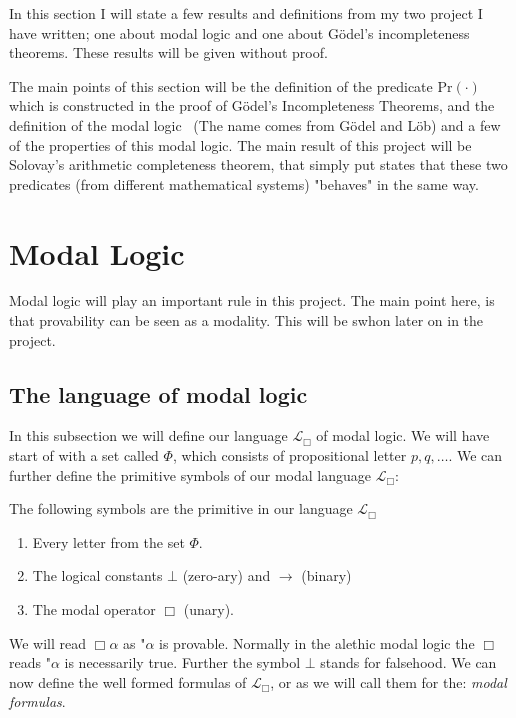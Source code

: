 \documentclass[../main.tex]{subfiles}
\begin{document}
In this section I will state a few results and definitions from my two project
I have written; one about modal logic and one about Gödel's incompleteness
theorems.
These results will be given without proof.

The main points of this section will be the definition of the predicate
$\text{Pr}(\cdot)$ which is constructed in the proof of  Gödel's Incompleteness
Theorems, and the definition of the modal logic \GL\
(The name comes from Gödel and Löb) and a few of the properties of this modal
logic. The
main result of this project will be Solovay's arithmetic completeness theorem,
that simply put states that these two predicates (from different mathematical
systems) "behaves" in the
same way.

\section{Modal Logic}
Modal logic will play an important rule in this project. The main point here,
is that provability can be seen as a modality. This will be swhon later on in
the project.

\subsection{The language of modal logic}
In this subsection we will define our language $\mathcal{L}_\Box$ of modal logic. 
We will have start of with a  set called $\Phi$, which consists of propositional letter
$p,q,\ldots$. We can further define the primitive symbols of our modal language
$\mathcal{L}_\Box$:

\begin{defi}
	The following symbols are the primitive in our language
	$\mathcal{L}_\Box$
	\begin{enumerate}
		\item Every letter from the set $\Phi$.
		\item The logical constants $\bot$ (zero-ary) and $\rightarrow$
			(binary)
		\item The modal operator $\Box$ (unary).
	\end{enumerate}
\end{defi}
We will read $\Box\alpha$ as "$\alpha$ is provable. Normally in the alethic modal logic the
$\Box$ reads "$\alpha$ is necessarily true. Further the symbol $\bot$ stands
for falsehood.
We can now define the well formed formulas of $\mathcal{L}_\Box$, or as we will
call them for the: \textit{modal formulas}.
\end{document}
